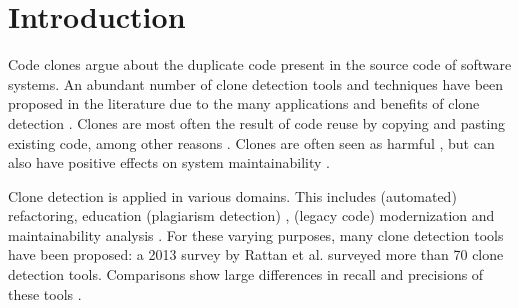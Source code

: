 \documentclass[sigplan,10pt,review,anonymous]{acmart}
\begin{document}




\maketitle


\section{Introduction}
Code clones argue about the duplicate code present in the source code of software systems. An abundant number of clone detection tools and techniques have been proposed in the literature due to the many applications and benefits of clone detection \cite{svajlenko2019mutation}. Clones are most often the result of code reuse by copying and pasting existing code, among other reasons \cite{roy2007survey}. Clones are often seen as harmful \cite{roy2007survey, ostberg2014automatically, juergens2009code}, but can also have positive effects on system maintainability \cite{roy2007survey, kapser2006cloning, aversano2007clones}.

Clone detection is applied in various domains. This includes (automated) refactoring, education (plagiarism detection) \cite{wahler2004clone}, (legacy code) modernization \cite{meng2013refactoring} and maintainability analysis \cite{heitlager2007practical}. For these varying purposes, many clone detection tools have been proposed: a 2013 survey by Rattan et al. \cite{rattan2013software} surveyed more than 70 clone detection tools. Comparisons show large differences in recall and precisions of these tools \cite{svajlenko2014evaluating}.
\end{document}
